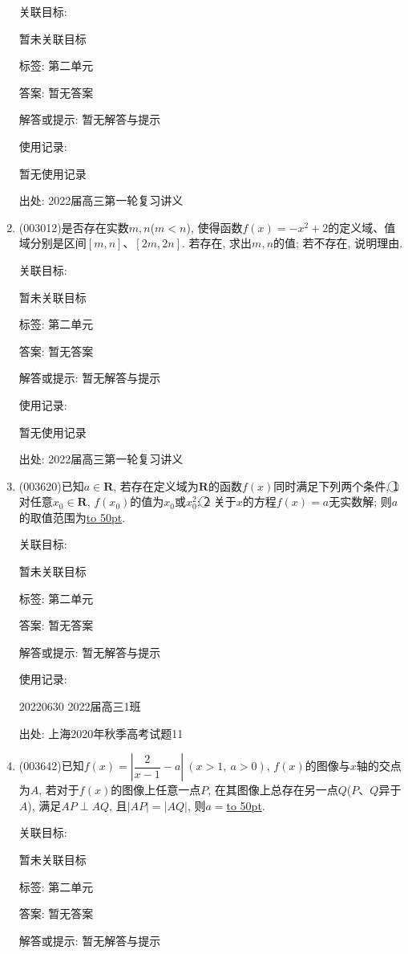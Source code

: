 \documentclass[10pt,a4paper]{article}
\newcommand{\blank}[1]{\underline{\hbox to #1pt{}}}
\begin{document}
\begin{enumerate}[1.]
关联目标:

暂未关联目标



标签: 第二单元

答案: 暂无答案

解答或提示: 暂无解答与提示

使用记录:

暂无使用记录


出处: 2022届高三第一轮复习讲义
\item { (003012)}是否存在实数$m,n$($m<n$), 使得函数$f(x)=-x^2+2$的定义域、值域分别是区间$[m,n]$、$[2m,2n]$. 若存在, 求出$m,n$的值; 若不存在, 说明理由.


关联目标:

暂未关联目标



标签: 第二单元

答案: 暂无答案

解答或提示: 暂无解答与提示

使用记录:

暂无使用记录


出处: 2022届高三第一轮复习讲义
\item { (003620)}已知$a\in \mathbf{R}$, 若存在定义域为$\mathbf{R}$的函数$f(x)$同时满足下列两个条件, \textcircled{1} 对任意$x_0\in \mathbf{R}$, $f(x_0)$的值为$x_0$或$x_0^2$; \textcircled{2} 关于$x$的方程$f(x)=a$无实数解; 则$a$的取值范围为\blank{50}.


关联目标:

暂未关联目标



标签: 第二单元

答案: 暂无答案

解答或提示: 暂无解答与提示

使用记录:

20220630	2022届高三1班	


出处: 上海2020年秋季高考试题11
\item { (003642)}已知$f(x)=\left|\dfrac{2}{x-1}-a\right| \ (x>1, \ a>0)$, $f(x)$的图像与$x$轴的交点为$A$, 若对于$f(x)$的图像上任意一点$P$, 在其图像上总存在另一点$Q$($P$、$Q$异于$A$), 满足$AP\perp AQ$, 且$|AP|=|AQ|$, 则$a=$\blank{50}.


关联目标:

暂未关联目标



标签: 第二单元

答案: 暂无答案

解答或提示: 暂无解答与提示


\end{enumerate}
\end{document}
